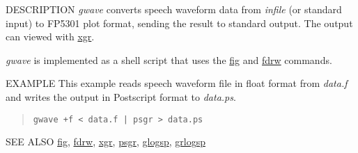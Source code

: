 \begin{synopsis}
\item[gwave] [ --F $F$] [ --s $S$ ] [ --e $E$ ] [ --n $N$ ] [ --i $I$ ] [ --y $ymax$ ]
               [ --y2 $ymin$ ] [ --p $P$ ] 
\item[\ ~~~~~~~~] [ +{\em type} ]  [ {\em infile} ]

\end{synopsis}

\begin{qsection}{DESCRIPTION}
{\em gwave} converts speech waveform data 
from {\em infile} (or standard input) to FP5301 plot format, 
sending the result to standard output. 
The output can viewed with \hyperlink{xgr}{xgr}.

{\em gwave} is implemented as a shell script 
that uses the \hyperlink{fig}{fig} and \hyperlink{fdrw}{fdrw} commands.
\end{qsection}

\begin{options}
\end{options}

\begin{qsection}{EXAMPLE}
This example reads speech waveform file in float format from
{\em data.f} and writes the output in Postscript format to
{\em data.ps}.
\begin{quote}
 \verb!gwave +f < data.f | psgr > data.ps!
 \end{quote}
\end{qsection}

\begin{qsection}{SEE ALSO}
\hyperlink{fig}{fig},
\hyperlink{fdrw}{fdrw},
\hyperlink{xgr}{xgr},
\hyperlink{psgr}{psgr},
\hyperlink{glogsp}{glogsp},
\hyperlink{grlogsp}{grlogsp}
\end{qsection}
